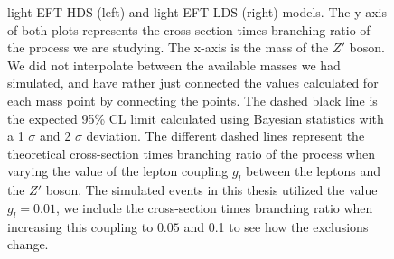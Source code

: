 \documentclass[12pt, a4paper]{book}
\begin{document}
\begin{figure}[!ht]
{   light EFT HDS (left) and light EFT LDS (right) models.
   The y-axis of both plots represents the cross-section times branching ratio of the process we are studying. The x-axis is the mass of the $Z'$ boson. We did not interpolate between the available masses we had simulated, 
   and have rather just connected the values calculated for each mass point by connecting the points. The dashed black line is the expected 95\% CL limit calculated using Bayesian statistics with a 1 $\sigma$ and 2 $\sigma$ deviation. 
   The different dashed lines represent the theoretical cross-section times branching ratio of the process when varying the value of the lepton coupling $g_l$ between the leptons and the $Z'$ boson. The simulated events in this thesis utilized the value $g_l=0.01$, we include the cross-section times branching ratio when increasing this coupling to $0.05$ and 0.1 to see how the exclusions change. 
   }\label{fig:model_dep_mono_Zp_excl}
\end{figure}



\clearpage
\end{document}
